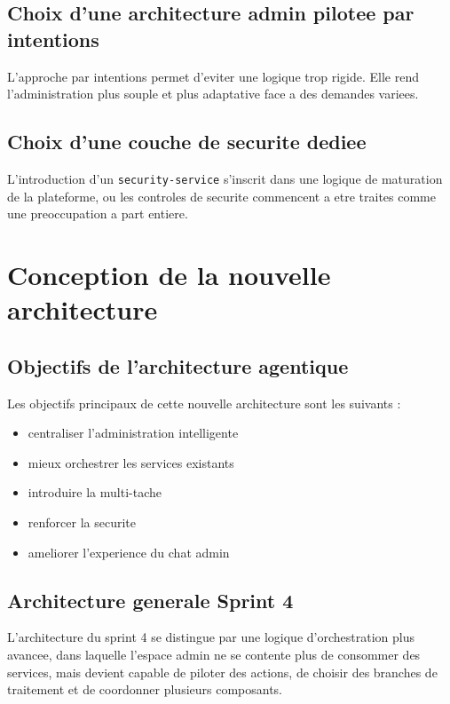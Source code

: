 \subsection{Choix d'une architecture admin pilotee par intentions}

L'approche par intentions permet d'eviter une logique trop rigide. Elle rend l'administration plus souple et plus adaptative face a des demandes variees.

\subsection{Choix d'une couche de securite dediee}

L'introduction d'un \texttt{security-service} s'inscrit dans une logique de maturation de la plateforme, ou les controles de securite commencent a etre traites comme une preoccupation a part entiere.

\section{Conception de la nouvelle architecture}

\subsection{Objectifs de l'architecture agentique}

Les objectifs principaux de cette nouvelle architecture sont les suivants :

\begin{itemize}
\item centraliser l'administration intelligente
\item mieux orchestrer les services existants
\item introduire la multi-tache
\item renforcer la securite
\item ameliorer l'experience du chat admin
\end{itemize}

\subsection{Architecture generale Sprint 4}

L'architecture du sprint 4 se distingue par une logique d'orchestration plus avancee, dans laquelle l'espace admin ne se contente plus de consommer des services, mais devient capable de piloter des actions, de choisir des branches de traitement et de coordonner plusieurs composants.

